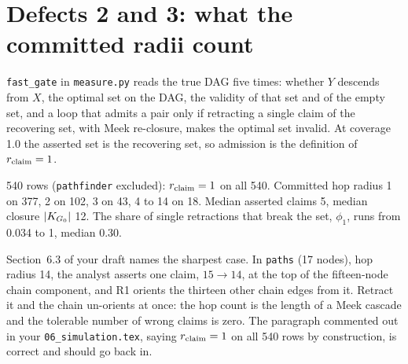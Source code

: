 \begin{antes}
\end{antes}

\section{Defects 2 and 3: what the committed radii count}

\texttt{fast\_gate} in \texttt{measure.py} reads the true DAG five times: whether $Y$ descends from $X$, the optimal set on the DAG,
the validity of that set and of the empty set, and a loop that admits a pair only if retracting a single claim of the recovering
set, with Meek re-closure, makes the optimal set invalid. At coverage 1.0 the asserted set is the recovering set, so admission is
the definition of $r_{\mathrm{claim}} = 1$.

\begin{medido}
540 rows (\texttt{pathfinder} excluded): $r_{\mathrm{claim}} = 1$ on all 540. Committed hop radius 1 on 377, 2 on 102, 3 on 43, 4 to 14 on
18. Median asserted claims 5, median closure $|K_{G_0}|$ 12. The share of single retractions that break the set, $\phi_1$, runs
from 0.034 to 1, median 0.30.
\end{medido}

Section~6.3 of your draft names the sharpest case. In \texttt{paths} (17 nodes), hop radius 14, the analyst asserts one claim, $15\to 14$, at
the top of the fifteen-node chain component, and R1 orients the thirteen other chain edges from it. Retract it and the chain un-orients at once:
the hop count is the length of a Meek cascade and the tolerable number of wrong claims is zero. The paragraph commented out in your
\texttt{06\_simulation.tex}, saying $r_{\mathrm{claim}} = 1$ on all 540 rows by construction, is correct and should go back in.

\begin{center}
\end{center}

